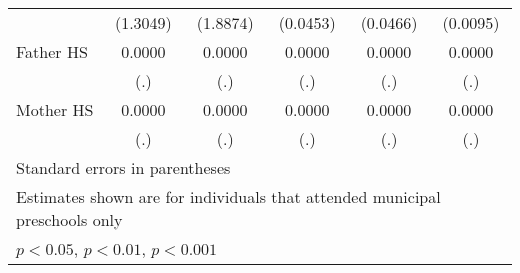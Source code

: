 \begin{table}[htbp]
\begin{tabular}{l*{5}{c}}
            &    (1.3049)         &    (1.8874)         &    (0.0453)         &    (0.0466)         &    (0.0095)         \\
\addlinespace
Father HS   &      0.0000         &      0.0000         &      0.0000         &      0.0000         &      0.0000         \\
            &         (.)         &         (.)         &         (.)         &         (.)         &         (.)         \\
\addlinespace
Mother HS   &      0.0000         &      0.0000         &      0.0000         &      0.0000         &      0.0000         \\
            &         (.)         &         (.)         &         (.)         &         (.)         &         (.)         \\
\bottomrule
\multicolumn{6}{l}{\footnotesize Standard errors in parentheses}\\
\multicolumn{6}{l}{\footnotesize Estimates shown are for individuals that attended municipal preschools only}\\
\multicolumn{6}{l}{\footnotesize \sym{*} \(p<0.05\), \sym{**} \(p<0.01\), \sym{***} \(p<0.001\)}\\
\end{tabular}
\end{table}
